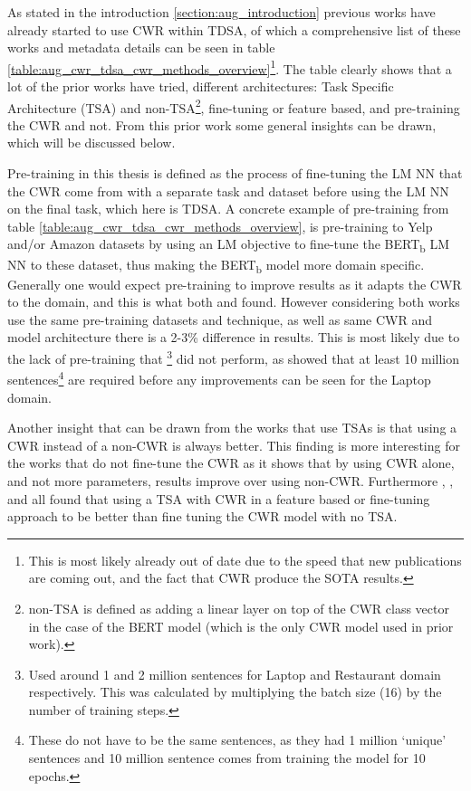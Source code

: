 As stated in the introduction \ref{section:aug_introduction} previous works have already started to use CWR within TDSA, of which a comprehensive list of these works and metadata details can be seen in table \ref{table:aug_cwr_tdsa_cwr_methods_overview}\footnote{This is most likely already out of date due to the speed that new publications are coming out, and the fact that CWR produce the SOTA results.}. The table clearly shows that a lot of the prior works have tried, different architectures: Task Specific Architecture (TSA) and non-TSA\footnote{non-TSA is defined as adding a linear layer on top of the CWR class vector in the case of the BERT model (which is the only CWR model used in prior work).}, fine-tuning or feature based, and pre-training the CWR and not. From this prior work some general insights can be drawn, which will be discussed below.

Pre-training in this thesis is defined as the process of fine-tuning the LM NN that the CWR come from with a separate task and dataset before using the LM NN on the final task, which here is TDSA. A concrete example of pre-training from table \ref{table:aug_cwr_tdsa_cwr_methods_overview}, is pre-training to Yelp and/or Amazon datasets by using an LM objective to fine-tune the BERT\textsubscript{b} LM NN to these dataset, thus making the BERT\textsubscript{b} model more domain specific. Generally one would expect pre-training to improve results as it adapts the CWR to the domain, and this is what both \citet{cwr_tdsa_models_rietzler2019adapt} and \citet{cwr_tdsa_models_xu-etal-2019-bert} found. However considering both works use the same pre-training datasets and technique, as well as same CWR and model architecture there is a 2-3\% difference in results. This is most likely due to the lack of pre-training that \citet{cwr_tdsa_models_xu-etal-2019-bert}\footnote{Used around 1 and 2 million sentences for Laptop and Restaurant domain respectively. This was calculated by multiplying the batch size (16) by the number of training steps.} did not perform, as \citet{cwr_tdsa_models_rietzler2019adapt} showed that at least 10 million sentences\footnote{These do not have to be the same sentences, as they had 1 million `unique' sentences and 10 million sentence comes from training the model for 10 epochs.} are required before any improvements can be seen for the Laptop domain.

Another insight that can be drawn from the works that use TSAs \citep{cwr_tdsa_models_zeng2019lcf,cwr_tdsa_models_zhaoa2019modeling,cwr_tdsa_models_song2019attentional,cwr_tdsa_models_huang2019syntax, methods_jiang-etal-2019-challenge} is that using a CWR instead of a non-CWR is always better. This finding is more interesting for the works that do not fine-tune the CWR \citep{cwr_tdsa_models_zhaoa2019modeling, cwr_tdsa_models_huang2019syntax} as it shows that by using CWR alone, and not more parameters, results improve over using non-CWR. Furthermore \citet{cwr_tdsa_models_song2019attentional}, \citet{methods_jiang-etal-2019-challenge}, and \citet{cwr_tdsa_models_huang2019syntax} all found that using a TSA with CWR in a feature based or fine-tuning approach to be better than fine tuning the CWR model with no TSA.

